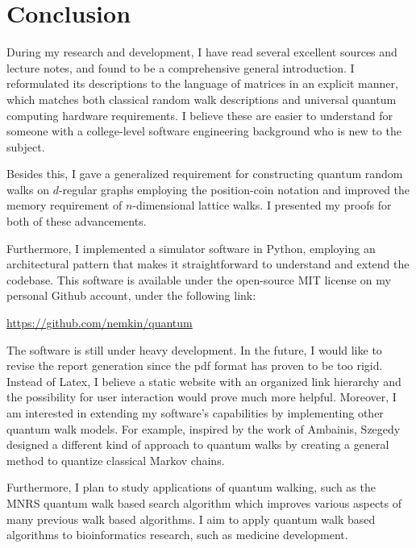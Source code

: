 \chapter{Conclusion}

During my research and development, I have read several excellent sources \cite{Aharonov, KempeIntroduction, Portugal, Santha, XiaReview} and lecture notes, and found \cite{Portugal} to be a comprehensive general introduction. I reformulated its descriptions to the language of matrices in an explicit manner, which matches both classical random walk descriptions and universal quantum computing hardware requirements. I believe these are easier to understand for someone with a college-level software engineering background who is new to the subject.

Besides this, I gave a generalized requirement for constructing quantum random walks on $d$-regular graphs employing the position-coin notation and improved the memory requirement of $n$-dimensional lattice walks. I presented my proofs for both of these advancements.

Furthermore, I implemented a simulator software in Python, employing an architectural pattern that makes it straightforward to understand and extend the codebase. This software is available under the open-source MIT license on my personal Github account, under the following link:

\url{https://github.com/nemkin/quantum}

The software is still under heavy development. In the future, I would like to revise the report generation since the pdf format has proven to be too rigid. Instead of Latex, I believe a static website with an organized link hierarchy and the possibility for user interaction would prove much more helpful. Moreover, I am interested in extending my software's capabilities by implementing other quantum walk models. For example, inspired by the work of Ambainis, Szegedy \cite{Szegedy} designed a different kind of approach to quantum walks by creating a general method to quantize classical Markov chains.

Furthermore, I plan to study applications of quantum walking, such as the MNRS quantum walk based search algorithm \cite{MNRS} which improves various aspects of many previous walk based algorithms. I aim to apply quantum walk based algorithms to bioinformatics research, such as medicine development.